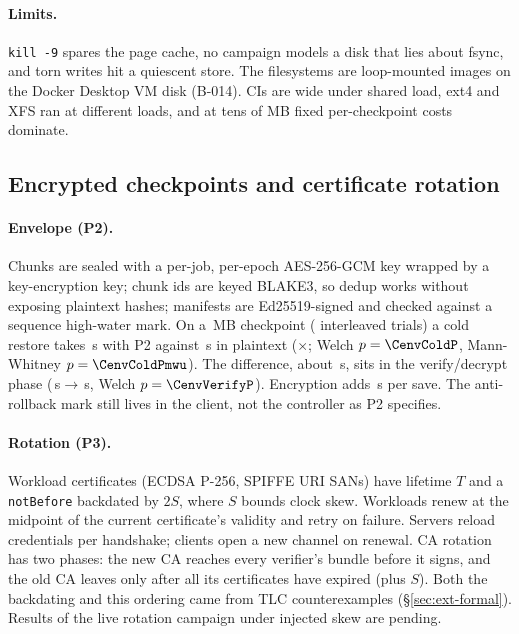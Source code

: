 \paragraph{Limits.} \texttt{kill -9} spares the page cache, no campaign models a disk that lies about
fsync, and torn writes hit a quiescent store. The filesystems are loop-mounted images on the Docker Desktop
VM disk (B-014). CIs are wide under shared load, ext4 and XFS ran at different loads, and at tens of MB
fixed per-checkpoint costs dominate.

\subsection{Encrypted checkpoints and certificate rotation}
\label{sec:ext-sec}

\paragraph{Envelope (P2).} Chunks are sealed with a per-job, per-epoch AES-256-GCM key wrapped by a
key-encryption key; chunk ids are keyed BLAKE3, so dedup works without exposing plaintext hashes; manifests
are Ed25519-signed and checked against a sequence high-water mark. On a \CenvStateMB\,MB checkpoint (\CenvTrials{} interleaved trials) a cold restore takes
\CenvColdPtwo\,s with P2 against \CenvColdPlain\,s in plaintext (\CenvColdRatio$\times$; Welch
$p=\CenvColdP$, Mann-Whitney $p=\CenvColdPmwu$). The difference, about \CenvColdAbs\,s, sits in the
verify/decrypt phase (\CenvVerifyPlain\,s$\to$\CenvVerifyPtwo\,s, Welch $p=\CenvVerifyP$). Encryption adds
\CenvSaveEncrypt\,s per save. The anti-rollback mark still lives in the client, not the controller as P2
specifies.

\paragraph{Rotation (P3).} Workload certificates (ECDSA P-256, SPIFFE URI SANs) have lifetime $T$ and a
\texttt{notBefore} backdated by $2S$, where $S$ bounds clock skew. Workloads renew at the midpoint of the
current certificate's validity and retry on failure. Servers reload credentials per handshake; clients open
a new channel on renewal. CA rotation has two phases: the new CA reaches every verifier's bundle before it
signs, and the old CA leaves only after all its certificates have expired (plus $S$). Both the backdating
and this ordering came from TLC counterexamples (\S\ref{sec:ext-formal}).
Results of the live rotation campaign under injected skew are pending.


